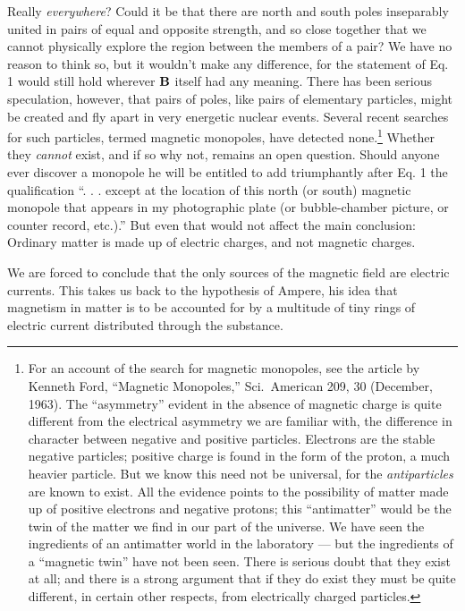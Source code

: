 Really \emph{everywhere}? Could it be that there are north and south
poles inseparably united in pairs of equal and opposite strength, and
so close together that we cannot physically explore the region between
the members of a pair? We have no reason to think so, but
it wouldn't make any difference, for the statement of Eq. 1 would
still hold wherever $\mathbf{B}$ itself had any meaning. There has been serious
speculation, however, that pairs of poles, like pairs of elementary
particles, might be created and fly apart in very energetic nuclear
events. Several recent searches for such particles, termed magnetic
monopoles, have detected none.\footnote{For an account of
the search for magnetic monopoles, see the article by Kenneth
Ford, ``Magnetic Monopoles,'' Sci.~American 209, 30 (December, 1963). The 
``asymmetry'' evident in the absence of magnetic charge is quite different from the electrical
asymmetry we are familiar with, the difference in character between negative and
positive particles. Electrons are the stable negative particles; positive charge is found
in the form of the proton, a much heavier particle. But we know this need not be
universal, for the \emph{antiparticles} are known to exist. All the evidence points to the possibility
of matter made up of positive electrons and negative protons; this ``antimatter''
would be the twin of the matter we find in our part of the universe. We have seen the
ingredients of an antimatter world in the laboratory --- but the ingredients of a 
``magnetic twin'' have not been seen. There is serious doubt that they exist at all; and
there is a strong argument that if they do exist they must be quite different, in certain
other respects, from electrically charged particles.} Whether they \emph{cannot} exist, and
if so why not, remains an open question. Should anyone ever discover
a monopole he will be entitled to add triumphantly after Eq. 1
the qualification ``. . . except at the location of this north (or south)
magnetic monopole that appears in my photographic plate (or
bubble-chamber picture, or counter record, etc.).'' But even that
would not affect the main conclusion: Ordinary matter is made up
of electric charges, and not magnetic charges.


We are forced to conclude that the only sources of the magnetic
field are electric currents. This takes us back to the hypothesis of
Ampere, his idea that magnetism in matter is to be accounted for by
a multitude of tiny rings of electric current distributed through the
substance.

